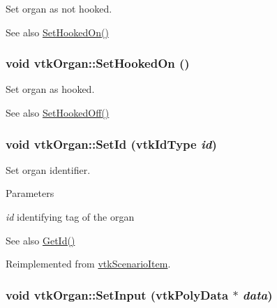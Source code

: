 Set organ as not hooked. 

\begin{DoxySeeAlso}{See also}
\hyperlink{classvtkOrgan_a78a3cdaeb7e6b23de0880dcb1c407cfe}{SetHookedOn()} 
\end{DoxySeeAlso}
\hypertarget{classvtkOrgan_a78a3cdaeb7e6b23de0880dcb1c407cfe}{
\subsubsection[{SetHookedOn}]{\setlength{\rightskip}{0pt plus 5cm}void vtkOrgan::SetHookedOn ()}}
\label{classvtkOrgan_a78a3cdaeb7e6b23de0880dcb1c407cfe}


Set organ as hooked. 

\begin{DoxySeeAlso}{See also}
\hyperlink{classvtkOrgan_ad2ac78a6020fba61ff49edad8a3f6a22}{SetHookedOff()} 
\end{DoxySeeAlso}
\hypertarget{classvtkOrgan_a0aab831b4e0a9d33ba961a0907b73e80}{
\subsubsection[{SetId}]{\setlength{\rightskip}{0pt plus 5cm}void vtkOrgan::SetId (vtkIdType {\em id})}}
\label{classvtkOrgan_a0aab831b4e0a9d33ba961a0907b73e80}


Set organ identifier. 


\begin{DoxyParams}{Parameters}
\item[{\em id}]identifying tag of the organ \end{DoxyParams}
\begin{DoxySeeAlso}{See also}
\hyperlink{classvtkOrgan_a8e45f79da9c4e7029492ced2f55c25ed}{GetId()} 
\end{DoxySeeAlso}


Reimplemented from \hyperlink{classvtkScenarioItem_afd99a6db7187837d0129e9898478ec60}{vtkScenarioItem}.

\hypertarget{classvtkOrgan_a63ce9adb7313bce4dc8aa547ba6736fc}{
\subsubsection[{SetInput}]{\setlength{\rightskip}{0pt plus 5cm}void vtkOrgan::SetInput (vtkPolyData $\ast$ {\em data})}}
\label{classvtkOrgan_a63ce9adb7313bce4dc8aa547ba6736fc}


